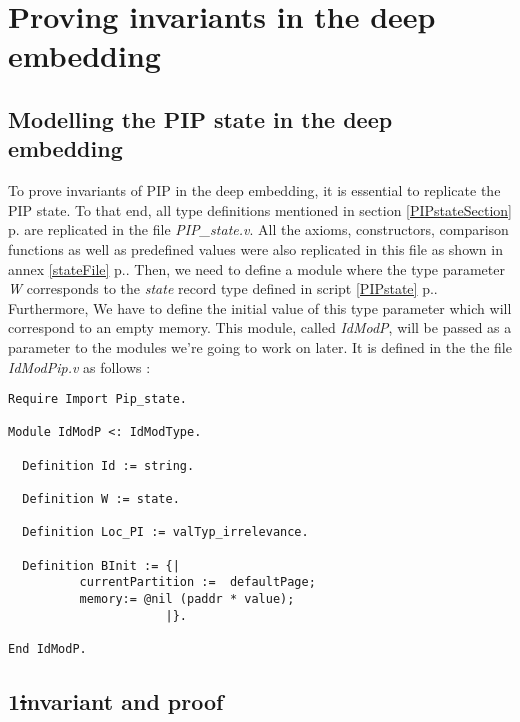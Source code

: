 \chapter{Proving invariants in the deep embedding} \label{Work}

 
\section{Modelling the PIP state in the deep embedding}
To prove invariants of PIP in the deep embedding, it is essential to replicate the PIP state. To that end, all type definitions mentioned in section \ref{PIPstateSection} p.\pageref{PIPstateSection} are replicated in the file \textit{PIP\_state.v}. All the axioms, constructors, comparison functions as well as predefined values were also replicated in this file as shown in annex \ref{stateFile} p.\pageref{stateFile}. Then, we need to define a module where the type parameter \textit{W} corresponds to the \textit{state} record type defined in script \ref{PIPstate} p.\pageref{PIPstate}. Furthermore, We have to define the initial value of this type parameter which will correspond to an empty memory. This module, called \textit{IdModP}, will be passed as a parameter to the modules we're going to work on later. It is defined in the the file \textit{IdModPip.v} as follows :
\begin{lstlisting}[caption = {Replicating the PIP state in the deep embedding}, xleftmargin=.1\textwidth,
xrightmargin=.1\textwidth]
Require Import Pip_state.

Module IdModP <: IdModType.
 
  Definition Id := string.
  
  Definition W := state.

  Definition Loc_PI := valTyp_irrelevance.

  Definition BInit := {|
          currentPartition :=  defaultPage;
          memory:= @nil (paddr * value);
                      |}.

End IdModP.
\end{lstlisting}

\section{1\st invariant and proof} 

